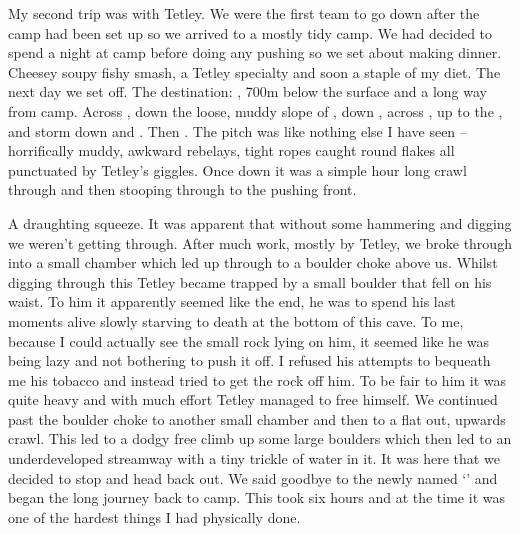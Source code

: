 My second trip was with Tetley. We were the first team to go down after the camp had been set up so we arrived to a mostly tidy camp. We had decided to spend a night at camp before doing any pushing so we set about making dinner. Cheesey soupy fishy smash, a Tetley specialty and soon a staple of my diet. The next day we set off. The destination: , 700m below the surface and a long way from camp. Across , down the loose, muddy slope of , down , across , up to the , and storm down  and . Then . The pitch was like nothing else I have seen -- horrifically muddy, awkward rebelays, tight ropes caught round flakes all punctuated by Tetley’s giggles. Once down it was a simple hour long crawl through  and then stooping through  to the pushing front.

A draughting squeeze. It was apparent that without some hammering and digging we weren’t getting through. After much work, mostly by Tetley, we broke through into a small chamber which led up through to a boulder choke above us. Whilst digging through this Tetley became trapped by a small boulder that fell on his waist. To him it apparently seemed like the end, he was to spend his last moments alive slowly starving to death at the bottom of this cave. To me, because I could actually see the small rock lying on him, it seemed like he was being lazy and not bothering to push it off. I refused his attempts to bequeath me his tobacco and instead tried to get the rock off him. To be fair to him it was quite heavy and with much effort Tetley managed to free himself. We continued past the boulder choke to another small chamber and then to a flat out, upwards crawl. This led to a dodgy free climb up some large boulders which then led to an underdeveloped streamway with a tiny trickle of water in it. It was here that we decided to stop and head back out. We said goodbye to the newly named ‘’ and began the long journey back to camp. This took six hours and at the time it was one of the hardest things I had physically done.


